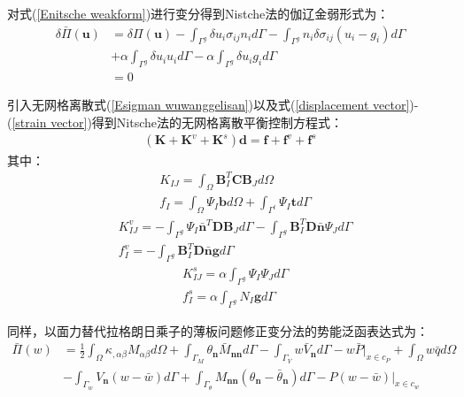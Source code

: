 对式(\ref{Enitsche weakform})进行变分得到Nistche法的伽辽金弱形式为：
\begin{equation}
\begin{split}
    \delta\bar{\Pi}(\pmb{u})&=\delta\Pi(\pmb{u})-\int_{\Gamma^g}\delta u_i\sigma_{ij}n_id\Gamma-\int_{\Gamma^g}n_i\delta\sigma_{ij}(u_i-g_i)d\Gamma\\
&+\alpha\int_{\Gamma^g}\delta u_iu_id\Gamma-\alpha\int_{\Gamma^g}\delta u_i g_id\Gamma\\
&=0
\end{split}
\end{equation}\par
引入无网格离散式(\ref{Esigman wuwanggelisan})以及式(\ref{displacement vector})-(\ref{strain vector})得到Nitsche法的无网格离散平衡控制方程式：
\begin{equation}
\begin{split}
    (\pmb{K}+\pmb{K}^v+\pmb{K}^s)\pmb{d}=\pmb{f}+\pmb{f}^v+\pmb{f}^s
\end{split}
\end{equation}
其中：
\begin{subequations}
\begin{align}
   &K_{I\!J}=\int_{\Omega}\pmb{B}_I^T\pmb{C}\pmb{B}_Jd\Omega\\
   &f_I=\int_{\Omega}\Psi_I\pmb{b}d\Omega+\int_{\Gamma^t}\Psi_I\pmb{t}d\Gamma
\end{align}
\end{subequations}
\begin{subequations}
\begin{align}    
    &K^v_{I\!J}=-\int_{\Gamma^g}\Psi_I\bar{\pmb{n}}^T\pmb{D}\pmb{B}_Jd\Gamma-\int_{\Gamma^g}\pmb{B}_I^T\pmb{D}\bar{\pmb{n}}\Psi_Jd\Gamma\\
     &f^v_I=-\int_{\Gamma^g}\pmb{B}_I^T\pmb{D}\bar{\pmb{n}}\pmb{g}d\Gamma
\end{align}
\end{subequations}
\begin{subequations}
\begin{align}   
   &K^s_{I\!J}=\alpha\int_{\Gamma^g}\Psi_I\Psi_Jd\Gamma\\
   &f^s_I=\alpha\int_{\Gamma^g}N_I\pmb{g}d\Gamma
\end{align}
\end{subequations}\par
同样，以面力替代拉格朗日乘子的薄板问题修正变分法的势能泛函表达式为：
\begin{equation}\label{Psigman}
\begin{split}
    \bar{\Pi}(w)&=\frac{1}{2}\int_{\Omega}\kappa_{,\alpha\beta}M_{\alpha\beta}d\Omega+\int_{\Gamma_M}\theta_{\pmb{n}}\bar{M}_{\pmb{nn}}d\Gamma-\int_{\Gamma_V}w\bar{V}_{\pmb{n}}d\Gamma-w\bar{P}\vert_{x\in c_P}+\int_{\Omega}w\bar{q}d\Omega\\
    &-\int_{\Gamma_w}V_{\pmb{n}}(w-\bar{w})d\Gamma+\int_{\Gamma_{\theta}}M_{\pmb{nn}}(\theta_{\pmb{n}}-\bar{\theta}_{\pmb{n}})d\Gamma-P(w-\bar{w})\vert_{x\in c_w}\\
\end{split}
\end{equation}
